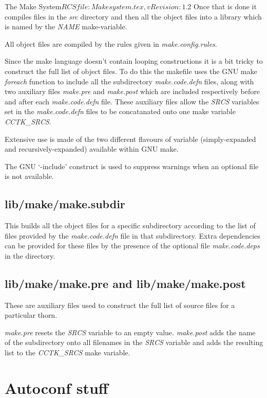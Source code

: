 \begin{cactuspart}{3}{The Make System}{$RCSfile: Makesystem.tex,v $}{$Revision: 1.2 $}
Once that is done it compiles files in the {\em src} directory and then all
the object files into a library which is named by the {\em NAME} make-variable.

All object files are compiled by the rules given in {\em make.config.rules}.

Since the make language doesn't contain looping constructions it is a bit tricky
to construct the full list of object files.  To do this the makefile uses
the GNU make {\em foreach} function to include all the subdirectory 
{\em make.code.defn} files, along with two auxiliary files {\em make.pre} and
{\em make.post} which are included respectively before and after each 
{\em make.code.defn} file.  These auxiliary files allow the {\em SRCS} variables set in
the {\em make.code.defn} files to be concatanated onto one make variable 
{\em CCTK\_SRCS}.

Extensive use is made of the two different flavours of variable (simply-expanded and 
recursively-expanded) available within GNU make.

The GNU `-include' construct is used to suppress warnings when an optional file is
not available.

\section{lib/make/make.subdir}
\label{sec:makefiles:subdir}

This builds all the object files for a specific subdirectory according
to the list of files provided by the {\em make.code.defn} file
in that subdirectory.  Extra dependencies can be provided for these 
files by the presence of the optional file {\em make.code.deps} in the
directory.

\section{lib/make/make.pre and lib/make/make.post}
\label{sec:makefiles:prepost}

These are auxiliary files used to construct the full list of source
files for a particular thorn.

{\em make.pre} resets the {\em SRCS} variable to an empty value.  
{\em make.post} adds the name of the subdirectory onto all filenames
in the {\em SRCS} variable and adds the resulting list to the 
{\em CCTK\_SRCS} make variable.

\chapter{Autoconf stuff}
\label{ch:autoconf}


\end{cactuspart}
